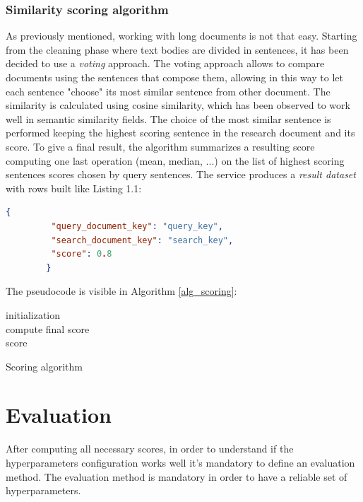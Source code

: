 \documentclass[\main/main.tex]{subfiles}
\begin{document}
\subsubsection{Similarity scoring algorithm}
As previously mentioned, working with long documents is not that easy. Starting from the cleaning phase where text bodies are divided in sentences, it has been decided to use a \emph{voting} approach. The voting approach allows to compare documents using the sentences that compose them, allowing in this way to let each sentence "choose" its most similar sentence from other document. The similarity is calculated using cosine similarity, which has been observed to work well in semantic similarity fields. The choice of the most similar sentence is performed keeping the highest scoring sentence in the research document and its score. To give a final result, the algorithm summarizes a resulting score computing one last operation (mean, median, ...) on the list of highest scoring sentences scores chosen by query sentences. The service produces a \emph{result dataset} with rows built like Listing 1.1:
\\
\begin{center}
    \begin{lstlisting}[language=json, caption="Parameter message example", captionpos=b]
        {
         "query_document_key": "query_key",
         "search_document_key": "search_key",
         "score": 0.8
        }
    \end{lstlisting}
\end{center}
The pseudocode is visible in Algorithm \ref{alg_scoring}:
\begin{center}
    \begin{algorithm}[H]
     initialization\\
     compute final score\\
     \Return score
     \caption{Scoring algorithm}
     \label{alg_scoring}
    \end{algorithm}
\end{center}

\section{Evaluation}
After computing all necessary scores, in order to understand if the hyperparameters configuration works well it's mandatory to define an evaluation method. The evaluation method is mandatory in order to have a reliable set of hyperparameters. \\
\end{document}
